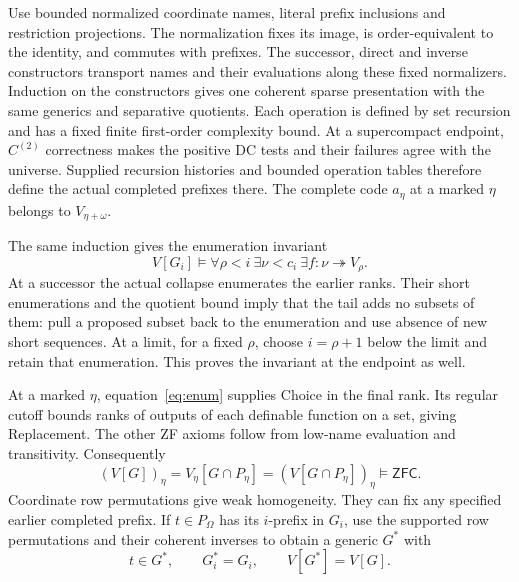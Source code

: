 \documentclass[11pt,a4paper]{amsart}
\newcommand{\ZFC}{\ensuremath{\mathsf{ZFC}}}
\begin{document}
Use bounded normalized coordinate names, literal prefix inclusions and restriction projections. The normalization fixes its image, is order-equivalent to the identity, and commutes with prefixes. The successor, direct and inverse constructors transport names and their evaluations along these fixed normalizers. Induction on the constructors gives one coherent sparse presentation with the same generics and separative quotients. Each operation is defined by set recursion and has a fixed finite first-order complexity bound. At a supercompact endpoint, $C^{(2)}$ correctness makes the positive DC tests and their failures agree with the universe. Supplied recursion histories and bounded operation tables therefore define the actual completed prefixes there. The complete code $a_\eta$ at a marked $\eta$ belongs to $V_{\eta+\omega}$.

The same induction gives the enumeration invariant
\begin{equation}\label{eq:enum}
V[G_i]\models\forall\rho<i\ \exists\nu<c_i\ \exists f:\nu\twoheadrightarrow V_\rho.
\end{equation}
At a successor the actual collapse enumerates the earlier ranks. Their short enumerations and the quotient bound imply that the tail adds no subsets of them: pull a proposed subset back to the enumeration and use absence of new short sequences. At a limit, for a fixed $\rho$, choose $i=\rho+1$ below the limit and retain that enumeration. This proves the invariant at the endpoint as well.

At a marked $\eta$, equation~\eqref{eq:enum} supplies Choice in the final rank. Its regular cutoff bounds ranks of outputs of each definable function on a set, giving Replacement. The other ZF axioms follow from low-name evaluation and transitivity. Consequently
\begin{equation}\label{eq:rank}
(V[G])_\eta=V_\eta[G\cap P_\eta]=(V[G\cap P_\eta])_\eta\models\ZFC.
\end{equation}
Coordinate row permutations give weak homogeneity. They can fix any specified earlier completed prefix. If $t\in P_\Omega$ has its $i$-prefix in $G_i$, use the supported row permutations and their coherent inverses to obtain a generic $G^*$ with
\begin{equation}\label{eq:move}
t\in G^*,\qquad G_i^*=G_i,\qquad V[G^*]=V[G].
\end{equation}
\end{document}
